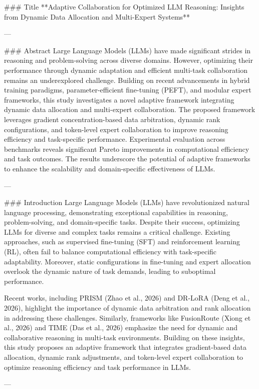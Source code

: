 ### Title  
**Adaptive Collaboration for Optimized LLM Reasoning: Insights from Dynamic Data Allocation and Multi-Expert Systems**

---

### Abstract  
Large Language Models (LLMs) have made significant strides in reasoning and problem-solving across diverse domains. However, optimizing their performance through dynamic adaptation and efficient multi-task collaboration remains an underexplored challenge. Building on recent advancements in hybrid training paradigms, parameter-efficient fine-tuning (PEFT), and modular expert frameworks, this study investigates a novel adaptive framework integrating dynamic data allocation and multi-expert collaboration. The proposed framework leverages gradient concentration-based data arbitration, dynamic rank configurations, and token-level expert collaboration to improve reasoning efficiency and task-specific performance. Experimental evaluation across benchmarks reveals significant Pareto improvements in computational efficiency and task outcomes. The results underscore the potential of adaptive frameworks to enhance the scalability and domain-specific effectiveness of LLMs.

---

### Introduction  
Large Language Models (LLMs) have revolutionized natural language processing, demonstrating exceptional capabilities in reasoning, problem-solving, and domain-specific tasks. Despite their success, optimizing LLMs for diverse and complex tasks remains a critical challenge. Existing approaches, such as supervised fine-tuning (SFT) and reinforcement learning (RL), often fail to balance computational efficiency with task-specific adaptability. Moreover, static configurations in fine-tuning and expert allocation overlook the dynamic nature of task demands, leading to suboptimal performance.

Recent works, including PRISM (Zhao et al., 2026) and DR-LoRA (Deng et al., 2026), highlight the importance of dynamic data arbitration and rank allocation in addressing these challenges. Similarly, frameworks like FusionRoute (Xiong et al., 2026) and TIME (Das et al., 2026) emphasize the need for dynamic and collaborative reasoning in multi-task environments. Building on these insights, this study proposes an adaptive framework that integrates gradient-based data allocation, dynamic rank adjustments, and token-level expert collaboration to optimize reasoning efficiency and task performance in LLMs.

---

